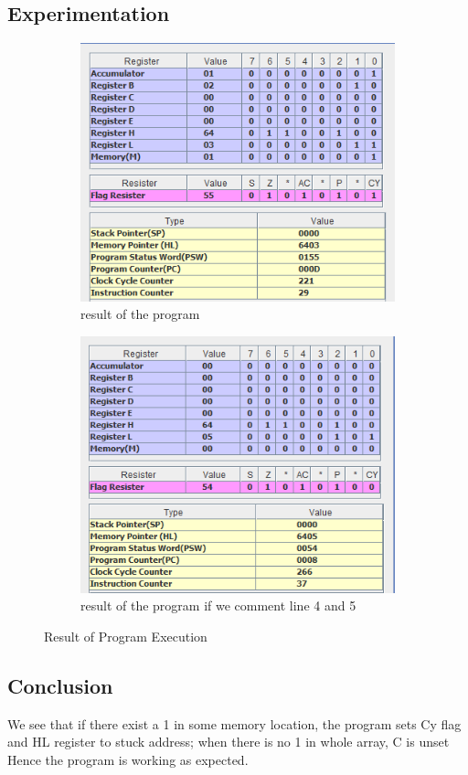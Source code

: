 \documentclass[a4paper]{article} %
\begin{document}
    \subsection{Experimentation}
    \begin{figure}[h!]
        \centering
        \begin{subfigure}[b]{0.49\linewidth}
            \centering
            \includegraphics[width=\linewidth]{Assignment 4/1_POST/yes_stuck.png}
            \caption{result of the program}
            \label{fg9a}
        \end{subfigure}
        \begin{subfigure}[b]{0.49\linewidth}
            \centering
            \includegraphics[width=\linewidth]{Assignment 4/1_POST/no_stuck.png}
            \caption{result of the program if we comment line 4 and 5}
            \label{fg9b}
        \end{subfigure}
        \caption{Result of Program Execution}
        \label{fg9}
    \end{figure}
    \subsection{Conclusion}
        We see that if there exist a 1 in some memory location, the program sets Cy flag and HL register to stuck address; when there is no 1 in whole array, C is unset\\
        Hence the program is working as expected.
\newpage
\end{document}
